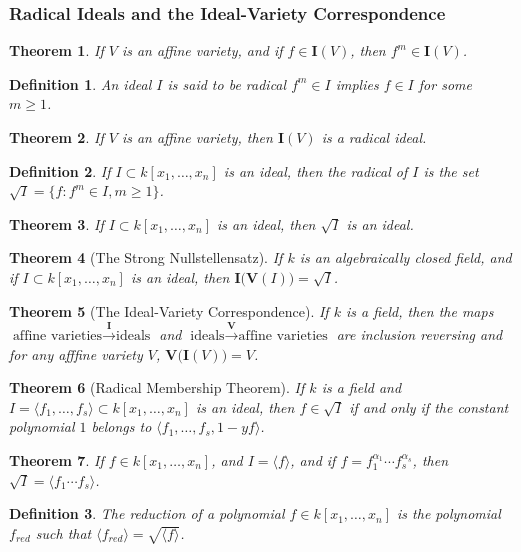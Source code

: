 \documentclass[oneside]{book}
\theoremstyle{mystyle}
\newtheorem{theorem}{Theorem}[section]
\newtheorem{definition}{Definition}[section]
\begin{document}
\subsubsection{Radical Ideals and the Ideal-Variety Correspondence}
\begin{theorem}
If $V$ is an affine variety, and if $f\in \textbf{I}(V)$, then $f^m\in \textbf{I}(V)$.
\end{theorem}
\begin{definition}
An ideal $I$ is said to be radical $f^m \in I$ implies $f\in I$ for some $m\geq 1$.
\end{definition}
\begin{theorem}
If $V$ is an affine variety, then $\textbf{I}(V)$ is a radical ideal.
\end{theorem}
\begin{definition}
If $I\subset k[x_1,\hdots ,x_n]$ is an ideal, then the radical of $I$ is the set $\sqrt{I} = \{f: f^m \in I, m \geq 1\}$.
\end{definition}
\begin{theorem}
If $I\subset k[x_1,\hdots ,x_n]$ is an ideal, then $\sqrt{I}$ is an ideal.
\end{theorem}
\begin{theorem}[The Strong Nullstellensatz]
If $k$ is an algebraically closed field, and if $I\subset k[x_1,\hdots ,x_n]$ is an ideal, then $\textbf{I}\big(\mathbf{V}(I)\big) = \sqrt{I}$.
\end{theorem}
\begin{theorem}[The Ideal-Variety Correspondence]
If $k$ is a field, then the maps $\textrm{affine varieties} \overset{\textbf{I}}\rightarrow \textrm{ideals}$ and $\textrm{ideals} \overset{\mathbf{V}}\rightarrow \textrm{affine varieties}$ are inclusion reversing and for any afffine variety $V$, $\mathbf{V}\big(\textbf{I}(V)\big) = V$.
\end{theorem}
\begin{theorem}[Radical Membership Theorem]
If $k$ is a field and $I=\langle f_1,\hdots, f_s\rangle\subset k[x_1,\hdots ,x_n]$ is an ideal, then $f\in \sqrt{I}$ if and only if the constant polynomial $1$ belongs to $\langle f_1,\hdots, f_s, 1-yf\rangle$.
\end{theorem}
\begin{theorem}
If $f\in k[x_1,\hdots ,x_n]$, and $I = \langle f\rangle$, and if $f = f_1^{\alpha_1}\cdots f_s^{\alpha_s}$, then $\sqrt{I} = \langle f_1\cdots f_s\rangle$.
\end{theorem}
\begin{definition}
The reduction of a polynomial $f\in k[x_1,\hdots ,x_n]$ is the polynomial $f_{red}$ such that $\langle f_{red}\rangle = \sqrt{\langle f\rangle}$.
\end{definition}
\end{document}
